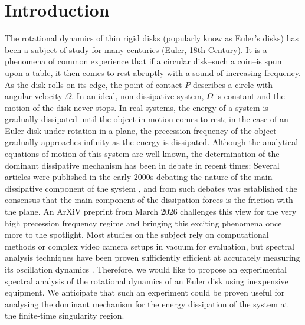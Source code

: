 \section{Introduction}

The rotational dynamics of thin rigid disks (popularly know as Euler's disks) has been a subject of study for many centuries (Euler, 18th Century). It is a phenomena of common experience that if a circular disk--such a coin--is spun upon a table, it then comes to rest abruptly with a sound of increasing frequency. As the disk rolls on its edge, the point of contact $P$ describes a circle with angular velocity $\Omega$. In an ideal, non-dissipative system, $\Omega$ is constant and the motion of the disk never stops. In real systems, the energy of a system is gradually dissipated until the object in motion comes to rest; in the case of an Euler disk under rotation in a plane, the precession frequency of the object gradually approaches infinity as the energy is dissipated. Although the analytical equations of motion of this system are well known, the determination of the dominant dissipative mechanism has been in debate in recent times: Several articles were published in the early 2000s \cite{Moffatt2000} debating the nature of the main dissipative component of the system \cite{PhysRevE2002, vandenEngh2000, Petrie2002}, and from such debates was established the consensus that the main component of the dissipation forces is the friction with the plane. An ArXiV preprint \cite{Thorne2026} from March 2026 challenges this view for the very high precession frequency regime and bringing this exciting phenomena once more to the spotlight. Most studies on the subject rely on computational methods or complex video camera setups in vacuum for evaluation, but spectral analysis techniques have been proven sufficiently efficient at accurately measuring its oscillation dynamics \cite{Darmendrail2021}. Therefore, we would like to propose an experimental spectral analysis of the rotational dynamics of an Euler disk using inexpensive equipment. We anticipate that such an experiment could be proven useful for analysing the dominant mechanism for the energy dissipation of the system at the finite-time singularity region.